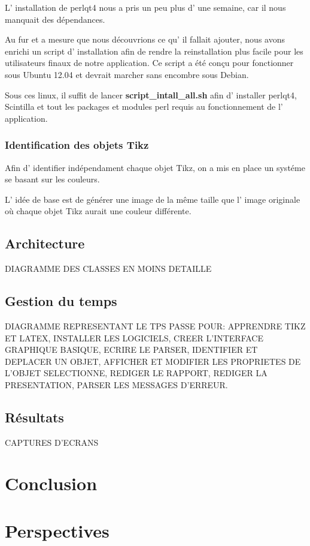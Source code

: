 \documentclass[a4paper]{report}
\begin{document}
L' installation de perlqt4 nous a pris un peu plus d' une semaine,
car il nous manquait des dépendances.

Au fur et a mesure que nous découvrions ce qu' il fallait ajouter,
nous avons enrichi un script d' installation afin de rendre la reinstallation
plus facile pour les utilisateurs finaux de notre application. Ce
script a été conçu pour fonctionner sous Ubuntu 12.04 et devrait marcher
sans encombre sous Debian.

Sous ces linux, il suffit de lancer \textbf{script\_intall\_all.sh}
afin d' installer perlqt4, Scintilla et tout les packages et modules
perl requis au fonctionnement de l' application.

\subsubsection{Identification des objets Tikz}

Afin d' identifier indépendament chaque objet Tikz, on a mis en place
un systéme se basant sur les couleurs.

L' idée de base est de générer une image de la même taille que l'
image originale où chaque objet Tikz aurait une couleur différente.  
  
  
  \subsection{Architecture}
  DIAGRAMME DES CLASSES EN MOINS DETAILLE   
  \subsection{Gestion du temps}
  DIAGRAMME REPRESENTANT LE TPS PASSE POUR: APPRENDRE TIKZ ET LATEX, INSTALLER LES LOGICIELS, CREER L'INTERFACE GRAPHIQUE BASIQUE, ECRIRE LE PARSER, IDENTIFIER ET DEPLACER UN OBJET, AFFICHER ET MODIFIER LES PROPRIETES DE L'OBJET SELECTIONNE, REDIGER LE RAPPORT, REDIGER LA PRESENTATION, PARSER LES MESSAGES D'ERREUR.
 
  \subsection{Résultats}
  CAPTURES D'ECRANS
  \section{Conclusion}
  \section{Perspectives}
   
\end{document}
